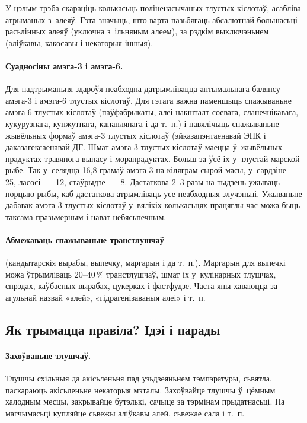 У цэлым трэба скараціць колькасьць поліненасычаных тлустых кіслотаў, асабліва атрыманых з~алеяў. Гэта значыць, што варта пазьбягаць абсалютнай большасьці расьлінных алеяў (уключна з~ільняным алеем), за рэдкім выключэньнем (аліўкавы, какосавы і некаторыя іншыя).

\paragraph{Суадносіны амэга-3 і амэга-6.}
Для падтрыманьня здароўя неабходна датрымлівацца аптымальнага балянсу амэга-3 і амэга-6 тлустых кіслотаў. Для гэтага важна паменшыць спажываньне амэга-6 тлустых кіслотаў (паўфабрыкаты, алеі накшталт соевага, сланечнікавага, кукурузнага, кунжутнага, канаплянага і да т.~п.) і павялічыць спажываньне жывёльных формаў амэга-3 тлустых кіслотаў (эйказапэнтаенавай ЭПК і даказагексаенавай ДГ. Шмат амэга-3 тлустых кіслотаў маецца ў~жывёльных прадуктах травянога выпасу і морапрадуктах. Больш за ўсё іх у~тлустай марской рыбе. Так у~селядца 16,8 грамаў амэга-3 на кіляграм сырой масы, у~сардзіне~--- 25, ласосі~--- 12, стаўрыдзе~--- 8. Дастаткова 2--3 разы на тыдзень ужываць порцыю рыбы, каб дастаткова атрымліваць усе неабходныя злучэньні. Ужываньне дабавак амэга-3 тлустых кіслотаў у~вялікіх колькасьцях працяглы час можа быць таксама празьмерным і нават небясьпечным.

\paragraph{Абмежаваць спажываньне транстлушчаў} (кандытарскія вырабы, выпечку, маргарын і да т.~п.).
Маргарын для выпечкі можа ўтрымліваць 20--40\,\% транстлушчаў, шмат іх у~кулінарных тлушчах, спрэдах, каўбасных вырабах, цукерках і фастфудзе. Часта яны хаваюцца за агульнай назвай «алей», «гідрагенізаваныя алеі» і т.~п.

\subsection{Як трымацца правіла? Ідэі і парады}

\paragraph{Захоўваньне тлушчаў.}
Тлушчы схільныя да акісьленьня пад узьдзеяньнем тэмпэратуры, сьвятла, паскараюць акісьленьне некаторыя мэталы. Захоўвайце тлушчы ў~цёмным халодным месцы, закрывайце бутэлькі, сачыце за тэрмінам прыдатнасьці. Па магчымасьці купляйце сьвежы аліўкавы алей, сьвежае сала і т.~п.

